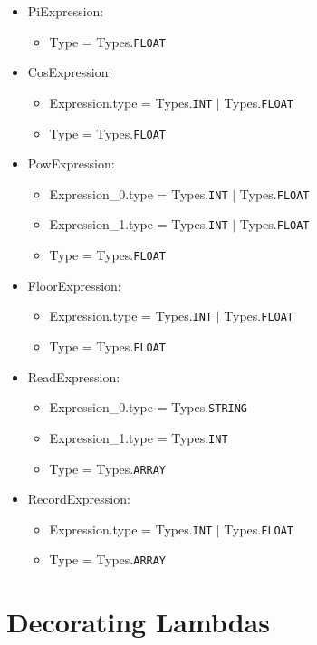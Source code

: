 \begin{itemize}
	\item PiExpression:
		\begin{itemize}
			\item Type = Types.\texttt{FLOAT}
		\end{itemize}
	\item CosExpression:
		\begin{itemize}
			\item Expression.type = Types.\texttt{INT} $|$ Types.\texttt{FLOAT}
			\item Type = Types.\texttt{FLOAT}
		\end{itemize}
	\item PowExpression:
		\begin{itemize}
			\item Expression\_0.type = Types.\texttt{INT} $|$ Types.\texttt{FLOAT}
			\item Expression\_1.type = Types.\texttt{INT} $|$ Types.\texttt{FLOAT}
			\item Type = Types.\texttt{FLOAT}
		\end{itemize}
	\item FloorExpression:
		\begin{itemize}
			\item Expression.type = Types.\texttt{INT} $|$ Types.\texttt{FLOAT}
			\item Type = Types.\texttt{FLOAT}
		\end{itemize}
	\item ReadExpression:
		\begin{itemize}
			\item Expression\_0.type = Types.\texttt{STRING}
			\item Expression\_1.type = Types.\texttt{INT}
			\item Type = Types.\texttt{ARRAY}
		\end{itemize}
	\item RecordExpression:
		\begin{itemize}
			\item Expression.type = Types.\texttt{INT} $|$ Types.\texttt{FLOAT}
			\item Type = Types.\texttt{ARRAY}
		\end{itemize}
\end{itemize}

\section{Decorating Lambdas}

